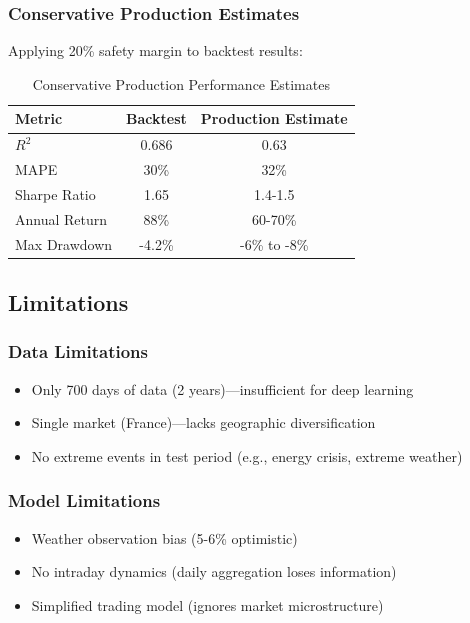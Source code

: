 \documentclass[11pt,a4paper]{article}
\begin{document}
\subsubsection{Conservative Production Estimates}

Applying 20\% safety margin to backtest results:

\begin{table}[H]
\centering
\begin{tabular}{lcc}
\toprule
\textbf{Metric} & \textbf{Backtest} & \textbf{Production Estimate} \\
\midrule
$R^2$ & 0.686 & 0.63 \\
MAPE & 30\% & 32\% \\
Sharpe Ratio & 1.65 & 1.4-1.5 \\
Annual Return & 88\% & 60-70\% \\
Max Drawdown & -4.2\% & -6\% to -8\% \\
\bottomrule
\end{tabular}
\caption{Conservative Production Performance Estimates}
\end{table}

\subsection{Limitations}

\subsubsection{Data Limitations}
\begin{itemize}
    \item Only 700 days of data (2 years)—insufficient for deep learning
    \item Single market (France)—lacks geographic diversification
    \item No extreme events in test period (e.g., energy crisis, extreme weather)
\end{itemize}

\subsubsection{Model Limitations}
\begin{itemize}
    \item Weather observation bias (5-6\% optimistic)
    \item No intraday dynamics (daily aggregation loses information)
    \item Simplified trading model (ignores market microstructure)
\end{itemize}
\end{document}

